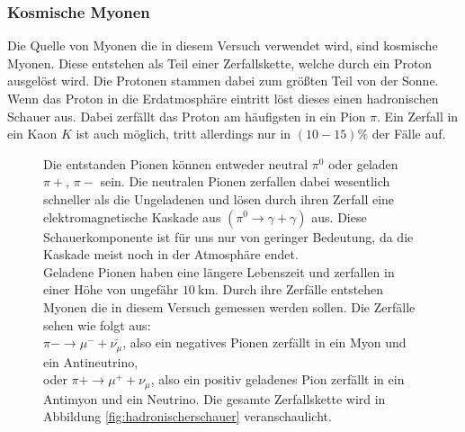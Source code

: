 \subsubsection{Kosmische Myonen}
Die Quelle von Myonen die in diesem Versuch verwendet wird, sind kosmische Myonen.
Diese entstehen als Teil einer Zerfallskette, welche durch ein Proton ausgelöst wird.
Die Protonen stammen dabei zum größten Teil von der Sonne.\\
Wenn das Proton in die Erdatmosphäre eintritt löst dieses einen hadronischen Schauer aus.
Dabei zerfällt das Proton am häufigsten in ein Pion $\pi$.
Ein Zerfall in ein Kaon $K$ ist auch möglich, tritt allerdings nur in $(10-15)\%$ der Fälle auf.
\FloatBarrier
\begin{figure}
    \begin{minipage}{0.55\textwidth}
Die entstanden Pionen können entweder neutral $\pi^0$ oder geladen $\pi+$, $\pi-$ sein.
Die neutralen Pionen zerfallen dabei wesentlich schneller als die Ungeladenen und lösen durch ihren Zerfall eine elektromagnetische Kaskade aus $(\pi^0 \rightarrow \gamma +\gamma)$ aus.
Diese Schauerkomponente ist für uns nur von geringer Bedeutung, da die Kaskade meist noch in der Atmosphäre endet.\\
Geladene Pionen haben eine längere Lebenszeit und zerfallen in einer Höhe von ungefähr $\SI{10}{\kilo\meter}$.
Durch ihre Zerfälle entstehen Myonen die in diesem Versuch gemessen werden sollen.
Die Zerfälle sehen wie folgt aus:\\ $\pi-\rightarrow \mu^- +\bar{\nu_\mu}$, also ein negatives Pionen zerfällt in ein Myon und ein Antineutrino,\\ oder $\pi+\rightarrow \mu^+ + \nu_\mu$, also ein positiv geladenes Pion zerfällt in ein Antimyon und ein Neutrino.
Die gesamte Zerfallskette wird in Abbildung \ref{fig:hadronischerschauer} veranschaulicht.
\end{minipage}
\hfill
\begin{minipage}{0.4\textwidth}

\end{minipage}
\end{figure}
